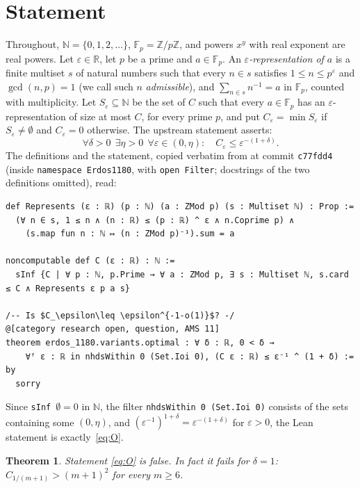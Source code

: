 \documentclass[11pt]{amsart}
\theoremstyle{plain}
\newtheorem{theorem}{Theorem}
\theoremstyle{definition}
\newcommand{\N}{\mathbb{N}}
\newcommand{\R}{\mathbb{R}}
\newcommand{\F}{\mathbb{F}_p}
\newcommand{\eps}{\varepsilon}
\begin{document}
\section{Statement}\label{sec:statement}

Throughout, $\N=\{0,1,2,\dots\}$, $\F=\mathbb{Z}/p\mathbb{Z}$, and powers $x^y$ with real exponent are real powers.
Let $\eps\in\R$, let $p$ be a prime and $a\in\F$.
An \emph{$\eps$-representation of $a$} is a finite multiset $s$ of natural numbers such that every $n\in s$ satisfies $1\le n\le p^\eps$ and $\gcd(n,p)=1$ (we call such $n$ \emph{admissible}), and $\sum_{n\in s}n^{-1}=a$ in $\F$, counted with multiplicity.
Let $S_\eps\subseteq\N$ be the set of $C$ such that every $a\in\F$ has an $\eps$-representation of size at most $C$, for every prime $p$, and put $C_\eps=\min S_\eps$ if $S_\eps\ne\emptyset$ and $C_\eps=0$ otherwise.
The upstream statement asserts:
\begin{equation}\label{eq:O}
  \forall\delta>0\ \ \exists\eta>0\ \ \forall\eps\in(0,\eta):\quad C_\eps\le\eps^{-(1+\delta)}.
\end{equation}
The definitions and the statement, copied verbatim from  at commit \texttt{c77fdd4} (inside \texttt{namespace Erdos1180}, with \texttt{open Filter}; docstrings of the two definitions omitted), read:
\begin{lstlisting}
def Represents (ε : ℝ) (p : ℕ) (a : ZMod p) (s : Multiset ℕ) : Prop :=
  (∀ n ∈ s, 1 ≤ n ∧ (n : ℝ) ≤ (p : ℝ) ^ ε ∧ n.Coprime p) ∧
    (s.map fun n : ℕ ↦ (n : ZMod p)⁻¹).sum = a

noncomputable def C (ε : ℝ) : ℕ :=
  sInf {C | ∀ p : ℕ, p.Prime → ∀ a : ZMod p, ∃ s : Multiset ℕ, s.card ≤ C ∧ Represents ε p a s}

/-- Is $C_\epsilon\leq \epsilon^{-1-o(1)}$? -/
@[category research open, question, AMS 11]
theorem erdos_1180.variants.optimal : ∀ δ : ℝ, 0 < δ →
    ∀ᶠ ε : ℝ in nhdsWithin 0 (Set.Ioi 0), (C ε : ℝ) ≤ ε⁻¹ ^ (1 + δ) := by
  sorry
\end{lstlisting}
Since \texttt{sInf}~$\emptyset=0$ in $\N$, the filter \texttt{nhdsWithin 0 (Set.Ioi 0)} consists of the sets containing some $(0,\eta)$, and $(\eps^{-1})^{1+\delta}=\eps^{-(1+\delta)}$ for $\eps>0$, the Lean statement is exactly~\eqref{eq:O}.

\begin{theorem}\label{thm:main}
Statement \eqref{eq:O} is false. In fact it fails for $\delta=1$: $C_{1/(m+1)}>(m+1)^2$ for every $m\ge6$.
\end{theorem}
\end{document}
